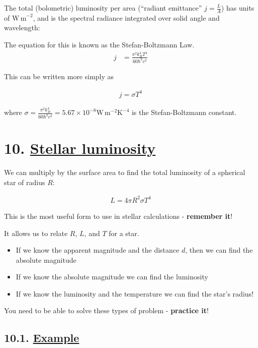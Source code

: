 \documentclass[
  letterpaper,
  DIV=11,
  numbers=noendperiod]{scrartcl}
\providecommand{\tightlist}{%
  \setlength{\itemsep}{0pt}\setlength{\parskip}{0pt}}\usepackage{longtable,booktabs,array}
\begin{document}
The total (bolometric) luminosity per area (``radiant emittance''
\(j=\frac{L}{A}\)) has units of \(\mathrm{W\,m}^{-2}\), and is the
spectral radiance integrated over solid angle and wavelength:

The equation for this is known as the Stefan-Boltzmann Law.
\begin{align}
j &= \frac{\pi^2 k_B^4 T^4}{60 \hbar^3 c^2}
\end{align}

This can be written more simply as

\begin{align}
j = \sigma T^4
\end{align}

where
\(\sigma = \frac{\pi^2 k_B^4 }{60 \hbar^3 c^2} = 5.67\times 10^{-8}\mathrm{W\,m^{-2}K^{-4}}\)
is the Stefan-Boltzmann constant.

\hypertarget{stellar-luminosity}{%
\section{\texorpdfstring{10. \protect\hyperlink{toc0_}{Stellar
luminosity}}{10. Stellar luminosity}}\label{stellar-luminosity}}

We can multiply by the surface area to find the total luminosity of a
spherical star of radius \(R\):

\begin{align}
L = 4\pi R^2 \sigma T^4
\end{align}

This is the most useful form to use in stellar calculations -
\textbf{remember it}!

It allows us to relate \(R\), \(L\), and \(T\) for a star.

\begin{itemize}
\tightlist
\item
  If we know the apparent magnitude and the distance \(d\), then we can
  find the absolute magnitude
\item
  If we know the absolute magnitude we can find the luminosity
\item
  If we know the luminosity and the temperature we can find the star's
  radius!
\end{itemize}

You need to be able to solve these types of problem - \textbf{practice
it}!

\hypertarget{example-3}{%
\subsection{\texorpdfstring{10.1.
\protect\hyperlink{toc0_}{Example}}{10.1. Example}}\label{example-3}}
\end{document}
